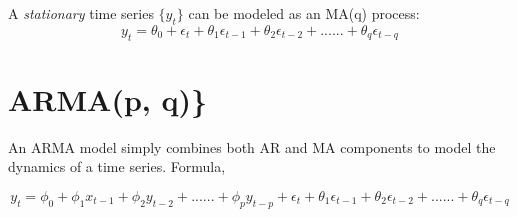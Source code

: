 \documentclass[]{book}
\theoremstyle{definition}
\theoremstyle{definition}
\theoremstyle{definition}
\theoremstyle{remark}
\begin{document}
A \emph{stationary} time series \(\{y_t\}\) can be modeled as an MA(q)
process: \begin{equation}
  y_t = \theta_0 + \epsilon_t + \theta_1 \epsilon_{t-1} + \theta_2 \epsilon_{t-2} + ...... + \theta_q \epsilon_{t-q}
    \end{equation}

\hypertarget{armap-q}{%
\section{ARMA(p, q)\}}\label{armap-q}}

An ARMA model simply combines both AR and MA components to model the
dynamics of a time series. Formula,

\begin{equation}
   y_t = \phi_0 +\phi_1 x_{t-1} + \phi_2 y_{t-2} + ...... + \phi_p y_{t-p}+\epsilon_t + \theta_1 \epsilon_{t-1} + \theta_2 \epsilon_{t-2} + ...... + \theta_q \epsilon_{t-q}
   \end{equation}


\end{document}
